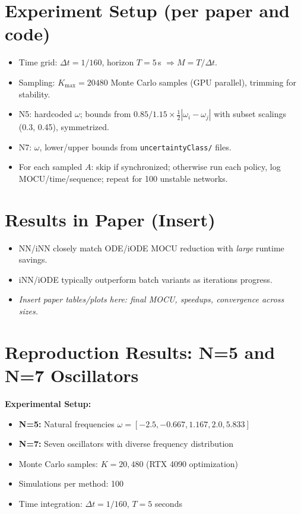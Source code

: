 \documentclass[11pt]{article}
\begin{document}
\newpage\section*{Experiment Setup (per paper and code)}
\begin{itemize}
\item Time grid: $\Delta t=1/160$, horizon $T=5$\,s $\Rightarrow M=T/\Delta t$.
\item Sampling: $K_{\max}=20480$ Monte Carlo samples (GPU parallel), trimming for stability.
\item N5: hardcoded $\omega$; bounds from $0.85/1.15\times \tfrac{1}{2}|\omega_i-\omega_j|$ with subset scalings (0.3, 0.45), symmetrized.
\item N7: $\omega$, lower/upper bounds from \texttt{uncertaintyClass/} files.
\item For each sampled $A$: skip if synchronized; otherwise run each policy, log MOCU/time/sequence; repeat for 100 unstable networks.
\end{itemize}

\newpage\section*{Results in Paper (Insert)}
\begin{itemize}
\item NN/iNN closely match ODE/iODE MOCU reduction with \emph{large} runtime savings.
\item iNN/iODE typically outperform batch variants as iterations progress.
\item \textit{Insert paper tables/plots here: final MOCU, speedups, convergence across sizes.}
\end{itemize}

\newpage\section*{Reproduction Results: N=5 and N=7 Oscillators}
\textbf{Experimental Setup:}
\begin{itemize}
\item \textbf{N=5:} Natural frequencies $\omega = [-2.5, -0.667, 1.167, 2.0, 5.833]$
\item \textbf{N=7:} Seven oscillators with diverse frequency distribution
\item Monte Carlo samples: $K = 20,480$ (RTX 4090 optimization)
\item Simulations per method: 100
\item Time integration: $\Delta t = 1/160$, $T = 5$ seconds
\end{itemize}
\end{document}
